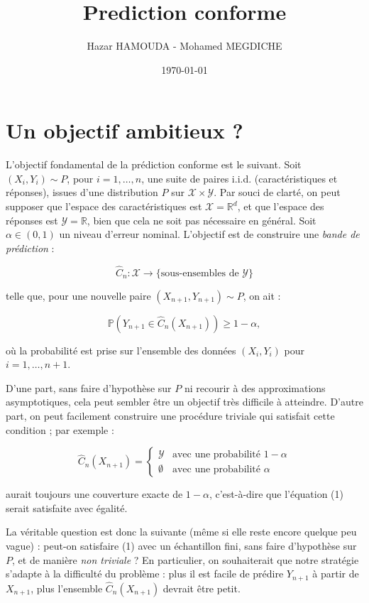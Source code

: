 \documentclass[a4paper,12pt]{article}%
\title{Prediction conforme}
\author{Hazar HAMOUDA - Mohamed MEGDICHE}
\date{\today}
\begin{document}
\maketitle

\section{Un objectif ambitieux ?}

L'objectif fondamental de la prédiction conforme est le suivant. Soit $(X_i, Y_i) \sim P$, pour $i = 1, \dots, n$, une suite de paires i.i.d. (caractéristiques et réponses), issues d'une distribution $P$ sur $\mathcal{X} \times \mathcal{Y}$. Par souci de clarté, on peut supposer que l'espace des caractéristiques est $\mathcal{X} = \mathbb{R}^d$, et que l'espace des réponses est $\mathcal{Y} = \mathbb{R}$, bien que cela ne soit pas nécessaire en général. Soit $\alpha \in (0, 1)$ un niveau d'erreur nominal. L'objectif est de construire une \emph{bande de prédiction} :

\[
\hat{C}_n : \mathcal{X} \rightarrow \{\text{sous-ensembles de } \mathcal{Y}\}
\]

telle que, pour une nouvelle paire $(X_{n+1}, Y_{n+1}) \sim P$, on ait :

\begin{equation}
\mathbb{P}(Y_{n+1} \in \hat{C}_n(X_{n+1})) \geq 1 - \alpha,
\end{equation}

où la probabilité est prise sur l'ensemble des données $(X_i, Y_i)$ pour $i = 1, \dots, n+1$.

D'une part, sans faire d'hypothèse sur $P$ ni recourir à des approximations asymptotiques, cela peut sembler être un objectif très difficile à atteindre. D'autre part, on peut facilement construire une procédure triviale qui satisfait cette condition ; par exemple :

\[
\hat{C}_n(X_{n+1}) =
\begin{cases}
\mathcal{Y} & \text{avec une probabilité } 1 - \alpha \\
\emptyset & \text{avec une probabilité } \alpha
\end{cases}
\]

aurait toujours une couverture exacte de $1 - \alpha$, c’est-à-dire que l’équation (1) serait satisfaite avec égalité.

La véritable question est donc la suivante (même si elle reste encore quelque peu vague) : peut-on satisfaire (1) avec un échantillon fini, sans faire d’hypothèse sur $P$, et de manière \emph{non triviale} ? En particulier, on souhaiterait que notre stratégie s’adapte à la difficulté du problème : plus il est facile de prédire $Y_{n+1}$ à partir de $X_{n+1}$, plus l'ensemble $\hat{C}_n(X_{n+1})$ devrait être petit.
\end{document}
